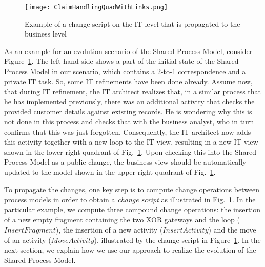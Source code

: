


\begin{figure}[t]
\begin{center}
\texttt{[image: ClaimHandlingQuadWithLinks.png]} %
\caption{Example of a change script on the IT level that is propagated to the business level}
\label{fig:Quad1}
\end{center}
\end{figure}

As an example for an evolution scenario of the Shared Process Model, consider Figure~\ref{fig:Quad1}. The left hand side shows a part of the initial state of the Shared Process Model in our scenario, which contains a 2-to-1 correspondence and a private IT task. So, some IT refinements have been done already. Assume now, that during IT refinement, the IT architect realizes that, in a similar process that he has implemented previously, there was an additional activity that checks the provided customer details against existing records. He is wondering why this is not done in this process and checks that with the business analyst, who in turn confirms that this was just forgotten. Consequently, the IT architect now adds this activity together with a new loop to the IT view, resulting in a new IT view shown in the lower right quadrant of Fig.~\ref{fig:Quad1}. Upon checking this into the Shared Process Model as a public change, the business view should be automatically updated to the model shown in the upper right quadrant of Fig.~\ref{fig:Quad1}. 

To propagate the changes, one key step is to compute change operations between process models in order to obtain a \emph{change script} as illustrated in Fig.~\ref{fig:Quad1}. In the particular example, we compute three compound change operations: the insertion of a new empty fragment containing the two XOR gateways and the loop ($InsertFragment$), the insertion of a new activity ($InsertActivity$) and the move of an activity ($MoveActivity$), illustrated by the change script in Figure~\ref{fig:Quad1}. In the next section, we explain how we use our approach to realize the evolution of the Shared Process Model.




